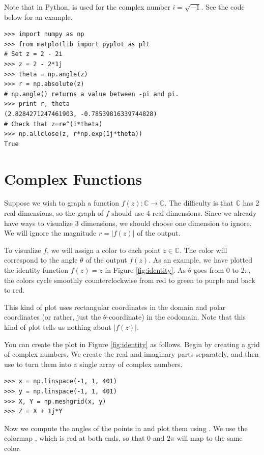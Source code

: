 Note that in Python,  is used for the complex number $i=\sqrt{-1}$.
See the code below for an example.

\begin{lstlisting}
>>> import numpy as np
>>> from matplotlib import pyplot as plt
# Set z = 2 - 2i
>>> z = 2 - 2*1j
>>> theta = np.angle(z)
>>> r = np.absolute(z)
# np.angle() returns a value between -pi and pi.
>>> print r, theta
(2.8284271247461903, -0.78539816339744828)
# Check that z=re^(i*theta)
>>> np.allclose(z, r*np.exp(1j*theta))
True
\end{lstlisting}

\section*{Complex Functions}

Suppose we wish to graph a function $f(z): \mathbb{C} \rightarrow \mathbb{C}$.
The difficulty is that $\mathbb{C}$ has 2 real dimensions, so the graph of $f$ should use 4 real dimensions.
 Since we already have ways to visualize 3 dimensions, we should choose one dimension to ignore.
 We will ignore the magnitude $r = |f(z)|$ of the output.

To visualize $f$, we will assign a color to each point $z \in \mathbb{C}$.
The color will correspond to the angle $\theta$ of the output $f(z)$.
As an example, we have plotted the identity function $f(z)=z$ in Figure \ref{fig:identity}.
As $\theta$ goes from 0 to $2\pi$, the colors cycle smoothly counterclockwise from red to green to purple and back to red.

This kind of plot uses rectangular coordinates in the domain and polar coordinates (or rather, just the $\theta$-coordinate) in the codomain.
Note that this kind of plot tells us nothing about $|f(z)|$.

You can create the plot in Figure \ref{fig:identity} as follows.
Begin by creating a grid of complex numbers.
We create the real and imaginary parts separately, and then use  to turn them into a single array of complex numbers.
\begin{lstlisting}
>>> x = np.linspace(-1, 1, 401)
>>> y = np.linspace(-1, 1, 401)
>>> X, Y = np.meshgrid(x, y)
>>> Z = X + 1j*Y
\end{lstlisting}

Now we compute the angles of the points in  and plot them using .
We use the colormap , which is red at both ends, so that $0$ and $2 \pi$ will map to the same color.

